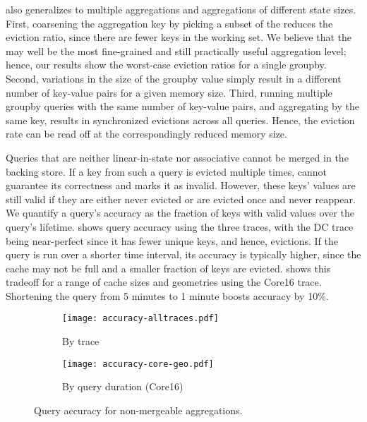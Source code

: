  also generalizes to multiple aggregations and aggregations
of different state sizes. 
First, coarsening the
aggregation key by picking a subset of the \txtftuple reduces the eviction
ratio, since there are fewer keys in the working set. We believe that the
\txtftuple may well be the most fine-grained and still practically useful
aggregation level; hence, our results show the worst-case eviction ratios for a
single {\ct groupby}.  Second, variations in the size of the {\ct groupby}
value simply result in a different number of key-value pairs for a given memory
size. Third, running multiple {\ct groupby} queries with the same number of
key-value pairs, and aggregating by the same key, results in synchronized
evictions across all queries. Hence, the eviction rate can be read off
 at the correspondingly reduced memory size.


Queries that are neither linear-in-state nor associative cannot be merged in
the backing store. If a key from such a query is evicted multiple times,
\TheSystem cannot guarantee its correctness and marks it as invalid. However,
these keys' values are still valid if they are either never evicted or are
evicted once and never reappear. We quantify a query's accuracy as the
fraction of keys with valid values over the query's lifetime.
 shows query accuracy using the three traces, with the DC
trace being near-perfect since it has fewer unique keys, and hence, evictions.
If the query is run over a shorter time interval, its accuracy is typically
higher, since the cache may not be full and a smaller fraction of keys are
evicted.   shows this tradeoff for a range of cache sizes
and geometries using the Core16 trace.  Shortening the query from 5 minutes to
1 minute boosts accuracy by 10\%.

\begin{figure}[ht]
\centering
\vspace{-0.1in}
\begin{subfigure}[t]{0.48\columnwidth}
\raggedright
\texttt{[image: accuracy-alltraces.pdf]}
\caption{By trace}
\label{fig:accuracy-traces}
\end{subfigure}
\begin{subfigure}[t]{0.48\columnwidth}
\raggedleft
\texttt{[image: accuracy-core-geo.pdf]}
\caption{By query duration (Core16)}
\label{fig:accuracy-time}
\end{subfigure}
\vspace{-0.1in}
\caption{Query accuracy for non-mergeable aggregations.}
\end{figure}
